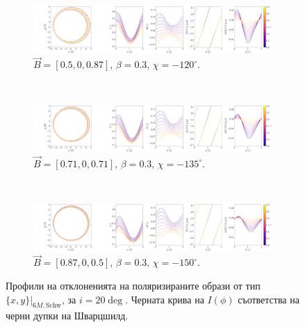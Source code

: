 \begin{figure}[!htb]
	\centering
	\begin{subfigure}{12cm}
		\hspace{-2cm}
		\includegraphics[scale = 0.15]{WH_delta_fig_B_0.5_0.87_0_20_deg_r6.png}
		\caption{$\vec{B} = [0.5, 0, 0.87]$, $\beta = 0.3$, $\chi = -120^\circ$.} 
	\end{subfigure}\\
	\begin{subfigure}{12cm}
		\hspace{-2cm}
		\includegraphics[scale = 0.15]{WH_delta_fig_B_0.71_0.71_0_20_deg_r6.png}
		\caption{$\vec{B} = [0.71, 0, 0.71]$, $\beta = 0.3$, $\chi = -135^\circ$.}
	\end{subfigure}\\
	\begin{subfigure}{12cm}
		\hspace{-2cm}
		\includegraphics[scale = 0.15]{WH_delta_fig_B_0.87_0.5_0_20_deg_r6.png}
		\caption{$\vec{B} = [0.87, 0, 0.5]$, $\beta = 0.3$, $\chi = -150^\circ$.}
	\end{subfigure}
	\caption[Профили на отклоненията на поляризираните образи oт тип $\{x,y\}\vert_{6M, \text{Schw}}$, за $i = 20\deg$.]{\small Профили на отклоненията на поляризираните образи от тип $\{x,y\}\vert_{6M, \text{Schw}}$, за $i = 20\deg$. Черната крива на $I(\phi)$ съответства на черни дупки на Шварцшилд.} 
	\label{WH_delta_r6}
\end{figure}

\newpage

